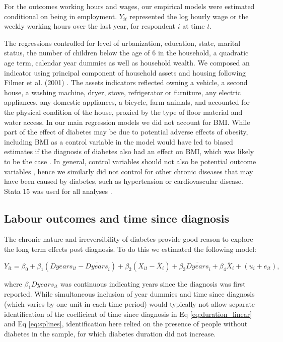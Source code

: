 \documentclass[12pt,english]{article}
\begin{document}
For the outcomes working hours and wages, our empirical models were estimated conditional on being in employment. $Y_{it}$ represented the log hourly wage or the weekly working hours over the last year, for respondent $i$ at time $t$.

The regressions controlled for level of urbanization, education, state, marital status, the number of children below the age of 6  in the household, a quadratic age term, calendar year dummies as well as household wealth. We composed an indicator using principal component of household assets and housing following Filmer et al. (2001) \parencite{Filmer2001}. The assets indicators reflected owning a vehicle, a second house, a washing machine, dryer, stove, refrigerator or furniture, any electric appliances, any domestic appliances, a bicycle, farm animals, and accounted for the physical condition of the house, proxied by the type of floor material and water access. In our main regression models we did not account for \ac{BMI}. While part of the effect of diabetes may be due to potential adverse effects of obesity, including \ac{BMI} as a control variable in the model would have led to biased estimates if the diagnosis of diabetes also had an effect on \ac{BMI}, which was likely to be the case \parencite{Slade2012,DeFineOlivarius2015}. In general, control variables should not also be potential outcome variables \parencite{Angrist2009a}, hence we similarly did not control for other chronic diseases that may have been caused by diabetes, such as hypertension or cardiovascular disease. Stata 15 was used for all analyses \parencite{StataCorp2017}.


\subsection{Labour outcomes and time since diagnosis}

The chronic nature and irreversibility of diabetes provide good reason to explore the long term effects post diagnosis.  To do this we estimated the following model:

\begin{equation}
Y_{it}=\beta_{0}+\beta_{1}(Dyears_{it}-\overline{Dyears}_{i})+\beta_{2}(X_{it}-\overline{X}_i)+\beta_{3}\overline{Dyears}_{i}+\beta_{4}\overline{X}_i+(u_{i}+e_{it}),\label{eq:duration_linear}
\end{equation}

where $\beta_{1}Dyears_{it}$ was continuous indicating years since the diagnosis was first reported. While simultaneous inclusion of year dummies and time since diagnosis (which varies by one unit in each time period) would typically not allow separate identification of the coefficient of time since diagnosis in Eq \ref{eq:duration_linear} and Eq  \ref{eq:splines}, identification here relied on the presence of people without diabetes in the sample, for which diabetes duration did not increase.
\end{document}
